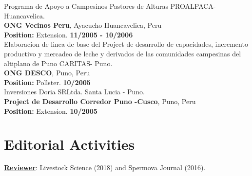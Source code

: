 \documentclass[margin,line,10pt]{res}
\begin{document}
\begin{resume}
Programa de Apoyo a Campesinos Pastores de Alturas PROALPACA-Huancavelica.\\
{\bf ONG Vecinos Peru}, Ayacucho-Huancavelica, Peru\\
\vspace{-.3cm}
\textbf{Position:} Extension.  \hfill {\bf 11/2005 - 10/2006}\\

Elaboracion de linea de base del Project de desarrollo de capacidades, incremento productivo y mercadeo de leche y derivados de las comunidades campesinas del altiplano de Puno CARITAS- Puno.\\
{\bf ONG DESCO}, Puno, Peru\\
\vspace{-.3cm}
\textbf{Position:} Pollster.  \hfill {\bf 10/2005}\\

Inversiones Doria SRLtda. Santa Lucia - Puno.\\
{\bf Project de Desarrollo Corredor Puno -Cusco}, Puno, Peru\\
\vspace{-.3cm}
\textbf{Position:} Extension.  \hfill {\bf 10/2005}\\

\vspace{0.5cm}


\section{\sc Editorial \phantom{1cm} Activities}

\begin{list7}
\item {\bf \underline{Reviewer}}: Livestock Science (2018) and Spermova Journal (2016).  
\end{list7}
\vspace{0.5cm}


\end{resume}
\end{document}
